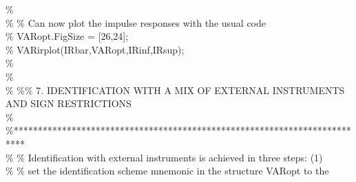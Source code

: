 \hspace{1mm}\hspace{5mm} \hspace{5mm} \textcolor{matlabgreen}{\%  }\\ 
\hspace{1mm}\hspace{5mm} \hspace{5mm} \textcolor{matlabgreen}{\% }\textcolor{matlabgreen}{\% Can now plot the impulse responses with the usual code }\\ 
\hspace{1mm}\hspace{5mm} \hspace{5mm} \textcolor{matlabgreen}{\% VARopt.FigSize = [26,24]; }\\ 
\hspace{1mm}\hspace{5mm} \hspace{5mm} \textcolor{matlabgreen}{\% VARirplot(IRbar,VARopt,IRinf,IRsup); }\\ 
\hspace{1mm}\hspace{5mm} \hspace{5mm} \textcolor{matlabgreen}{\%  }\\ 
\hspace{1mm}\hspace{5mm} \hspace{5mm} \textcolor{matlabgreen}{\%  }\\ 
\hspace{1mm}\hspace{5mm} \hspace{5mm} \textcolor{matlabgreen}{\% }\textcolor{matlabgreen}{\%}\textcolor{matlabgreen}{\% 7. IDENTIFICATION WITH A MIX OF EXTERNAL INSTRUMENTS AND SIGN RESTRICTIONS }\\ 
\hspace{1mm}\hspace{5mm} \hspace{5mm} \textcolor{matlabgreen}{\% }\textcolor{matlabgreen}{\%**************************************************************************  }\\ 
\hspace{1mm}\hspace{5mm} \hspace{5mm} \textcolor{matlabgreen}{\% }\textcolor{matlabgreen}{\% Identification with external instruments is achieved in three steps: (1)  }\\ 
\hspace{1mm}\hspace{5mm} \hspace{5mm} \textcolor{matlabgreen}{\% }\textcolor{matlabgreen}{\% set the identification scheme mnemonic in the structure VARopt to the  }\\ 
